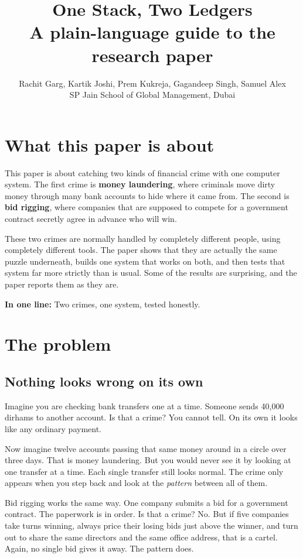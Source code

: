 \documentclass[11pt,a4paper]{article}
\title{\textbf{One Stack, Two Ledgers}\\[4pt]
\large A plain-language guide to the research paper}
\author{Rachit Garg, Kartik Joshi, Prem Kukreja, Gagandeep Singh, Samuel Alex\\
\small SP Jain School of Global Management, Dubai}
\date{}
\newcommand{\inoneline}[1]{%
  \medskip\noindent\colorbox{gray!10}{\parbox{\dimexpr\linewidth-2\fboxsep}{%
  \textbf{In one line:} #1}}\medskip}
\begin{document}
\maketitle

\section*{What this paper is about}

This paper is about catching two kinds of financial crime with one computer
system. The first crime is \textbf{money laundering}, where criminals move
dirty money through many bank accounts to hide where it came from. The second
is \textbf{bid rigging}, where companies that are supposed to compete for a
government contract secretly agree in advance who will win.

These two crimes are normally handled by completely different people, using
completely different tools. The paper shows that they are actually the same
puzzle underneath, builds one system that works on both, and then tests that
system far more strictly than is usual. Some of the results are surprising, and
the paper reports them as they are.

\inoneline{Two crimes, one system, tested honestly.}

\section{The problem}

\subsection{Nothing looks wrong on its own}

Imagine you are checking bank transfers one at a time. Someone sends 40,000
dirhams to another account. Is that a crime? You cannot tell. On its own it
looks like any ordinary payment.

Now imagine twelve accounts passing that same money around in a circle over
three days. That is money laundering. But you would never see it by looking at
one transfer at a time. Each single transfer still looks normal. The crime only
appears when you step back and look at the \emph{pattern} between all of them.

Bid rigging works the same way. One company submits a bid for a government
contract. The paperwork is in order. Is that a crime? No. But if five companies
take turns winning, always price their losing bids just above the winner, and
turn out to share the same directors and the same office address, that is a
cartel. Again, no single bid gives it away. The pattern does.
\end{document}
